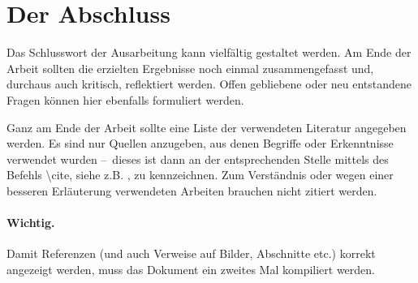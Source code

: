 \documentclass[draft]{tcs-seminar}
\begin{document}
\section{Der Abschluss}

Das Schlusswort der Ausarbeitung kann vielfältig gestaltet werden.
Am Ende der Arbeit sollten die erzielten Ergebnisse noch einmal zusammengefasst
und, durchaus auch kritisch, reflektiert werden.
Offen gebliebene oder neu entstandene Fragen
können hier ebenfalls formuliert werden.

Ganz am Ende der Arbeit sollte eine Liste
der verwendeten Literatur angegeben werden.
Es sind nur Quellen anzugeben,
aus denen Begriffe oder Erkenntnisse verwendet wurden
--~dieses ist dann an der entsprechenden Stelle mittels des Befehls
\textsf{\textbackslash cite}, siehe z.B. \cite{oetiker06}, zu kennzeichnen.
Zum Verständnis oder wegen einer besseren Erläuterung verwendeten Arbeiten
brauchen nicht zitiert werden.
\paragraph{Wichtig.}
Damit Referenzen (und auch Verweise auf Bilder, Abschnitte etc.)
korrekt angezeigt werden, muss das Dokument ein zweites Mal kompiliert werden.

\begin{thebibliography}{9}  
    
\end{thebibliography}
\end{document}
